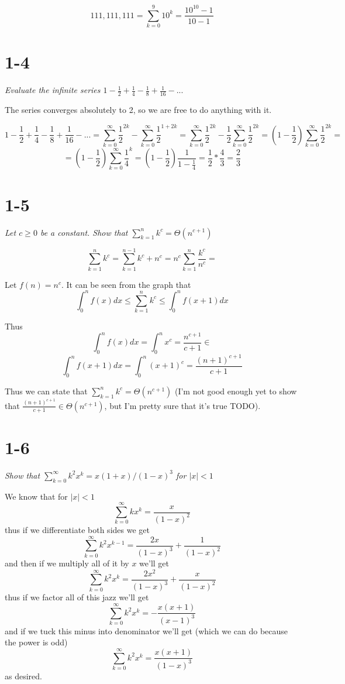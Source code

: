 \documentclass[11pt,oneside,titlepage]{book}
\begin{document}
$$111,111,111 = \sum_{k = 0}^{9}{10^k} = \frac{10^{10} - 1}{10 - 1}$$

\section*{1-4}
\textit{Evaluate the infinite series $1 - \frac 1 2 + \frac 1 4 - \frac 1 8
  + \frac{1}{16} - ...$}

The series converges absolutely to 2, so we are free to do anything with it.

$$1 - \frac 1 2 + \frac 1 4 - \frac 1 8
+ \frac{1}{16} - ... = 
\sum_{k = 0}^{\infty}{\frac{1}{2}^{2k}}
- \sum_{k = 0}^{\infty}{\frac{1}{2}^{1 + 2k}} =
\sum_{k = 0}^{\infty}{\frac{1}{2}^{2k}}
- \frac{1}{2}\sum_{k = 0}^{\infty}{\frac{1}{2}^{2k}} =
\left(1 - \frac{1}{2}\right)\sum_{k = 0}^{\infty}{\frac{1}{2}^{2k}} = 
$$
$$
= \left(1 - \frac{1}{2}\right)\sum_{k = 0}^{\infty}{\frac{1}{4}^{k}}
= \left(1 - \frac{1}{2}\right)\frac{1}{1 - \frac{1}{4}}
= \frac 1 2 *  \frac 4 3 = \frac 2 3
$$

\section*{1-5}
\textit{Let $c \geq 0$ be a constant. Show that
  $\sum_{k = 1}^{n}{k^c} = \Theta(n^{c + 1})$}

$$
\sum_{k = 1}^{n}{k^c} = \sum_{k = 1}^{n - 1}{k^c} + n^c =
n^c\sum_{k = 1}^{n}{\frac{k^c}{n^c}} =
$$

Let $f(n) = n^c$.
It can be seen from the graph that
$$\int_{0}^{n}{f(x)dx} \leq \sum_{k = 1}^{n}{k^c} \leq
\int_{0}^{n}{f(x + 1)dx}$$

Thus 
$$\int_0^n{f(x)dx} = \int_0^n{x^c} = \frac{n^{c + 1}}{c + 1} \in$$
$$\int_0^n{f(x + 1)dx} = \int_0^n{(x + 1)^c} = \frac{(n + 1)^{c + 1}}{c + 1}$$

Thus we can state that $\sum_{k = 1}^{n}{k^c} = \Theta(n^{c + 1})$
(I'm not good enough yet to show that $\frac{(n + 1)^{c + 1}}{c + 1} \in
\Theta(n^{c + 1})$, but I'm pretty sure that it's true TODO).



\section*{1-6}
\textit{Show that $\sum_{k=0}^{\infty}{k^2 x^k} = x(1 + x)/(1 - x)^3$ for
  $|x| < 1$}

We know that for $|x| < 1$
$$\sum_{k = 0}^{\infty}{kx^k} = \frac{x}{(1 - x)^2}$$
thus if we differentiate both sides we get
$$\sum_{k = 0}^{\infty}{k^2x^{k - 1}} = \frac{2x}{(1 - x)^3}
+ \frac{1}{(1 - x)^2} $$
and then if we multiply all of it by $x$ we'll get
$$\sum_{k = 0}^{\infty}{k^2x^k} = \frac{2x^2}{(1 - x)^3}
+ \frac{x}{(1 - x)^2} $$
thus if we factor all of this jazz we'll get
$$\sum_{k = 0}^{\infty}{k^2x^k} = - \frac{x(x + 1)}{(x - 1)^3}$$
and if we tuck this minus into denominator we'll get (which we can do because
the power is odd)
$$\sum_{k = 0}^{\infty}{k^2x^k} = \frac{x(x + 1)}{(1 - x)^3}$$
as desired.
\end{document}
